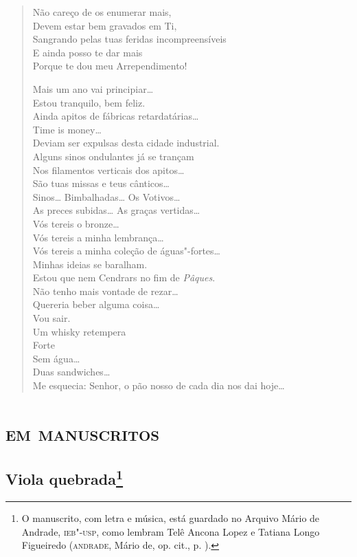 \begin{verse}
Não careço de os enumerar mais,\\
Devem estar bem gravados em Ti,\\
Sangrando pelas tuas feridas incompreensíveis\\
E ainda posso te dar mais\\
Porque te dou meu Arrependimento!

Mais um ano vai principiar\ldots{}\\
Estou tranquilo, bem feliz.\\
Ainda apitos de fábricas retardatárias\ldots{}\\
\qquad\qquad\qquad\qquad\quad Time is money\ldots{}\\
\qquad Deviam ser expulsas desta cidade industrial.\\
Alguns sinos ondulantes já se trançam\\
Nos filamentos verticais dos apitos\ldots{}\\
São tuas missas e teus cânticos\ldots{}\\
Sinos\ldots{} Bimbalhadas\ldots{} Os Votivos\ldots{}\\
As preces subidas\ldots{} As graças vertidas\ldots{}\\
Vós tereis o bronze\ldots{}\\
\qquad Vós tereis a minha lembrança\ldots{}\\
\qquad\qquad Vós tereis a minha coleção de águas"-fortes\ldots{}\\
Minhas ideias se baralham.\\
Estou que nem Cendrars no fim de \emph{Pâques}.\\
Não tenho mais vontade de rezar\ldots{}\\
Quereria beber alguma coisa\ldots{}\\
Vou sair.\\
Um whisky retempera\\
\qquad Forte\\
\qquad Sem água\ldots{}\\
Duas sandwiches\ldots{}\\
Me esquecia: Senhor, o pão nosso de cada dia nos dai hoje\ldots{}
\end{verse}

\chapter{\textsc{em manuscritos}}

\section{Viola quebrada\footnote[*]{O manuscrito, com letra e música, está
  guardado no Arquivo Mário de Andrade, \textsc{ieb"-usp}, como lembram Telê
  Ancona Lopez e Tatiana Longo Figueiredo (\textsc{andrade}, Mário de, op. cit.,
  p. ).}}

